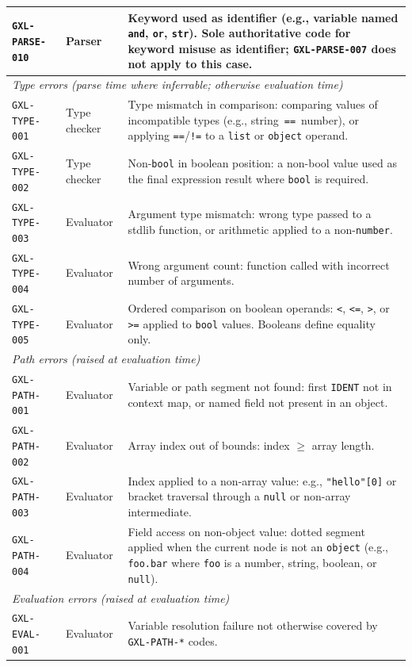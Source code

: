 \begin{table}[ht]
\begin{tabular}{p{3.0cm}p{3.0cm}p{7.0cm}}
\texttt{GXL-PARSE-010} & Parser & Keyword used as identifier (e.g., variable named \texttt{and}, \texttt{or}, \texttt{str}). Sole authoritative code for keyword misuse as identifier; \texttt{GXL-PARSE-007} does not apply to this case. \\
\hline
\multicolumn{3}{l}{\textit{Type errors (parse time where inferrable; otherwise evaluation time)}} \\
\hline
\texttt{GXL-TYPE-001} & Type checker & Type mismatch in comparison: comparing values of incompatible types (e.g., string~\texttt{==}~number), or applying \texttt{==}/\texttt{!=} to a \texttt{list} or \texttt{object} operand. \\
\texttt{GXL-TYPE-002} & Type checker & Non-\texttt{bool} in boolean position: a non-bool value used as the final expression result where \texttt{bool} is required. \\
\texttt{GXL-TYPE-003} & Evaluator & Argument type mismatch: wrong type passed to a stdlib function, or arithmetic applied to a non-\texttt{number}. \\
\texttt{GXL-TYPE-004} & Evaluator & Wrong argument count: function called with incorrect number of arguments. \\
\texttt{GXL-TYPE-005} & Evaluator & Ordered comparison on boolean operands: \texttt{<}, \texttt{<=}, \texttt{>}, or \texttt{>=} applied to \texttt{bool} values. Booleans define equality only. \\
\hline
\multicolumn{3}{l}{\textit{Path errors (raised at evaluation time)}} \\
\hline
\texttt{GXL-PATH-001} & Evaluator & Variable or path segment not found: first \texttt{IDENT} not in context map, or named field not present in an object. \\
\texttt{GXL-PATH-002} & Evaluator & Array index out of bounds: index $\geq$ array length. \\
\texttt{GXL-PATH-003} & Evaluator & Index applied to a non-array value: e.g., \texttt{"hello"[0]} or bracket traversal through a \texttt{null} or non-array intermediate. \\
\texttt{GXL-PATH-004} & Evaluator & Field access on non-object value: dotted segment applied when the current node is not an \texttt{object} (e.g., \texttt{foo.bar} where \texttt{foo} is a number, string, boolean, or \texttt{null}). \\
\hline
\multicolumn{3}{l}{\textit{Evaluation errors (raised at evaluation time)}} \\
\hline
\texttt{GXL-EVAL-001} & Evaluator & Variable resolution failure not otherwise covered by \texttt{GXL-PATH-*} codes. \\

\end{tabular}
\end{table}
